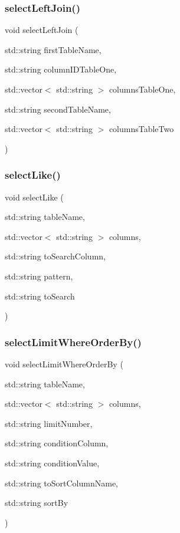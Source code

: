 \mbox{\label{sqllib_8hpp_a85d81ccc1d4c2b8cb7edcfe0a5a585f5}} 
\subsubsection{select\+Left\+Join()}
{\footnotesize\ttfamily void select\+Left\+Join (\begin{DoxyParamCaption}\item[{std\+::string}]{first\+Table\+Name,  }\item[{std\+::string}]{column\+I\+D\+Table\+One,  }\item[{std\+::vector$<$ std\+::string $>$}]{columns\+Table\+One,  }\item[{std\+::string}]{second\+Table\+Name,  }\item[{std\+::vector$<$ std\+::string $>$}]{columns\+Table\+Two }\end{DoxyParamCaption})}

\mbox{\label{sqllib_8hpp_a80ced4bb0e929e97740616c59374d992}} 
\subsubsection{select\+Like()}
{\footnotesize\ttfamily void select\+Like (\begin{DoxyParamCaption}\item[{std\+::string}]{table\+Name,  }\item[{std\+::vector$<$ std\+::string $>$}]{columns,  }\item[{std\+::string}]{to\+Search\+Column,  }\item[{std\+::string}]{pattern,  }\item[{std\+::string}]{to\+Search }\end{DoxyParamCaption})}

\mbox{\label{sqllib_8hpp_a94c57cf58c1b2812e3d1ce9b3837286d}} 
\subsubsection{select\+Limit\+Where\+Order\+By()}
{\footnotesize\ttfamily void select\+Limit\+Where\+Order\+By (\begin{DoxyParamCaption}\item[{std\+::string}]{table\+Name,  }\item[{std\+::vector$<$ std\+::string $>$}]{columns,  }\item[{std\+::string}]{limit\+Number,  }\item[{std\+::string}]{condition\+Column,  }\item[{std\+::string}]{condition\+Value,  }\item[{std\+::string}]{to\+Sort\+Column\+Name,  }\item[{std\+::string}]{sort\+By }\end{DoxyParamCaption})}

